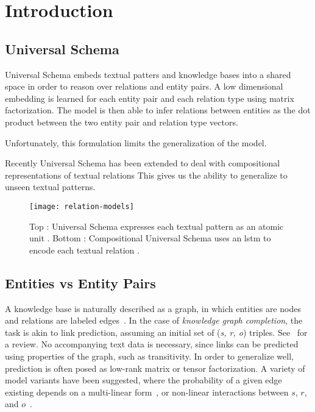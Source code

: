 
\section{Introduction\label{introduction}}

\subsection {Universal Schema}

Universal Schema embeds textual patters and knowledge bases into a shared space in order to reason over relations and entity pairs.
A low dimensional embedding is learned for each entity pair and each relation type using matrix factorization.
The model is then able to infer relations between entities as the dot product between the two entity pair and relation type vectors.

Unfortunately, this formulation limits the generalization of the model.

Recently Universal Schema has been extended to deal with compositional representations of textual relations \citep{toutanova2015representing,verga2015multilingual}
This gives us the ability to generalize to unseen textual patterns.

\begin{figure}[h]
\caption{Top : Universal Schema expresses each textual pattern as an atomic unit \protect\citet{riedel2010modeling}.
Bottom : Compositional Universal Schema uses an lstm to encode each textual relation \protect\cite{verga2015multilingual}. }
\centering
\texttt{[image: relation-models]}
\end{figure}


\subsection {Entities vs Entity Pairs}

A knowledge base is naturally described as a graph, in which entities are nodes and relations are labeled edges~\citep{yago,freebase}.
In the case of \emph{knowledge graph completion}, the task is akin to link prediction, assuming an initial set of (\emph{s, r, o}) triples.
See~\citet{nickel2015review} for a review.
No accompanying text data is necessary, since links can be predicted using properties of the graph, such as transitivity.
In order to generalize well, prediction is often posed as low-rank matrix or tensor factorization.
A variety of model variants have been suggested, where the probability of a given edge existing depends on a multi-linear form~\citep{rescal,DBLP:journals/corr/Garcia-DuranBUG15,bishan,transe,wang2014knowledge,lin2015learning}, or non-linear interactions between $s$, $r$, and $o$~\citep{socherkb}.

